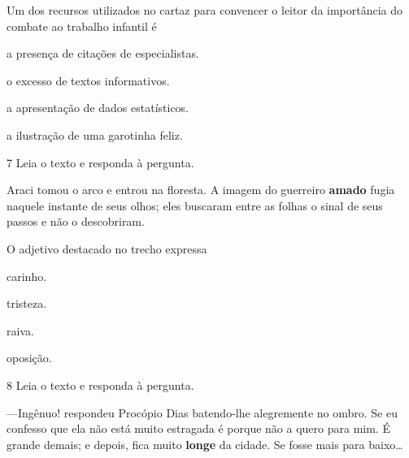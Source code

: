 \begin{myquote}
\begin{myescolha}
Um dos recursos utilizados no cartaz para convencer o leitor da
importância do combate ao trabalho infantil é

\begin{escolha}
  \item a presença de citações de especialistas.

  \item o excesso de textos informativos.

  \item a apresentação de dados estatísticos.

  \item a ilustração de uma garotinha feliz.
\end{escolha}

\num{7} Leia o texto e responda à pergunta.

\begin{myquote}
Araci tomou o arco e entrou na floresta. A imagem do guerreiro
\textbf{amado} fugia naquele instante de seus olhos; eles buscaram entre as
folhas o sinal de seus passos e não o descobriram.

\end{myquote}

O adjetivo destacado no trecho expressa

\begin{escolha}
  \item carinho.

  \item tristeza.

  \item raiva.

  \item oposição.
\end{escolha}

\num{8} Leia o texto e responda à pergunta.

\begin{myquote}
---Ingênuo! respondeu Procópio Dias batendo-lhe alegremente no ombro.
Se eu confesso que ela não está muito estragada é porque não a quero
para mim. É grande demais; e depois, fica muito \textbf{longe} da cidade.
Se fosse mais para baixo\ldots

\end{myquote}


\end{myescolha}
\end{myquote}
